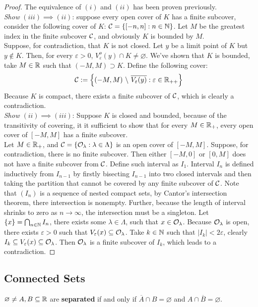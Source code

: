 \documentclass[11pt]{article}
\begin{document}
	\begin{proof}
		The equivalence of $(i)$ and $(ii)$ has been proven previously. \\
		\emph{Show} $(iii) \implies (ii)$: suppose every open cover of $K$ has a finite subcover, consider the following cover of $K$: $\mathcal{{C}} = \{[-n, n]: n \in \mathbb{N}\}$. Let $M$ be the greatest index in the finite subcover $\mathcal{{C}}$, and obviously $K$ is bounded by $M$. \\
		Suppose, for contradiction, that $K$ is not closed. Let $y$ be a limit point of $K$ but $y \notin K$. Then, for every $\varepsilon > 0$, $V_\varepsilon^o(y) \cap K \neq \varnothing$. We've shown that $K$ is bounded, take $M \in \mathbb{R}$ such that $(-M, M) \supset K$. Define the following cover:
		\begin{align}
			\mathcal{{C}} := \left\{
			(-M, M)\ \backslash\ \overline{V_\varepsilon(y)}
			:\varepsilon \in \mathbb{R}_{++}
			\right\}
		\end{align}
		Because $K$ is compact, there exists a finite subcover of $\mathcal{{C}}$, which is clearly a contradiction. \\
		\emph{Show $(ii) \implies (iii)$}: Suppose $K$ is closed and bounded, because of the transitivity of covering, it it sufficient to show that for every $M \in \mathbb{R}_+$, every open cover of $[-M, M]$ has a finite subcover. \\
		Let $M \in \mathbb{R}_+$, and $\mathcal{{C}} = \{\mathcal{{O}}_\lambda: \lambda \in \Lambda\}$ is an open cover of $[-M, M]$. Suppose, for contradiction, there is no finite subcover. Then either $[-M, 0]$ or $[0, M]$ does not have a finite subcover from $\mathcal{{C}}$. Define such interval as $I_1$. Interval $I_n$ is defined inductively from $I_{n-1}$ by firstly bisecting $I_{n-1}$ into two closed intervals and then taking the partition that cannot be covered by any finite subcover of $\mathcal{{C}}$. Note that $(I_n)$ is a sequence of nested compact sets, by Cantor's intersection theorem, there intersection is nonempty. Further, because the length of interval shrinks to zero as $n \to \infty$, the intersection must be a singleton. Let $\{x\} = \bigcap_{n \in \mathbb{N}} I_n$, there exists some $\lambda \in \Lambda$, such that $x \in \mathcal{{O}}_\lambda$. Because $\mathcal{{O}}_\lambda$ is open, there exists $\varepsilon > 0$ such that $V_\varepsilon(x) \subseteq \mathcal{{O}}_\lambda$. Take $k \in \mathbb{N}$ such that $|I_k| < 2\varepsilon$, clearly $I_k \subseteq V_\varepsilon(x) \subseteq \mathcal{{O}}_\lambda$. Then $\mathcal{{O}}_\lambda$ is a finite subcover of $I_k$, which leads to a contradiction.
	\end{proof}
	\subsection{Connected Sets}
	\begin{definition}
		$\varnothing \neq A, B \subseteq \mathbb{R}$ are \textbf{separated} if and only if $\overline{A} \cap B = \varnothing$ and $A \cap \overline{B} = \varnothing$.
	\end{definition}
	
\end{document}
